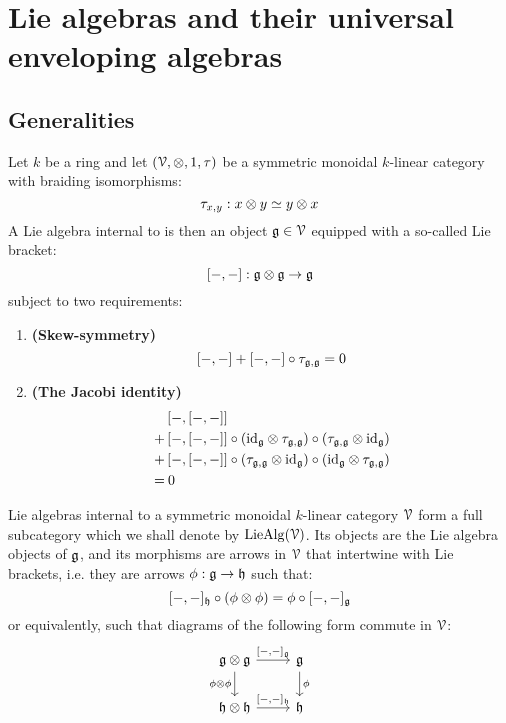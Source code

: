 \section{Lie algebras and their universal enveloping algebras}
    \subsection{Generalities}
        \begin{definition} \label{def: lie_algebras}
            Let $k$ be a ring and let $(\calV, \tensor, 1, \tau)$ be a symmetric monoidal $k$-linear category with braiding isomorphisms:
                $$\tau_{x, y}: x \tensor y \cong y \tensor x$$
            A Lie algebra internal to is then an object $\mathfrak{g} \in \mathcal{V}$ equipped with a so-called Lie bracket:
                $$[-,-]: \g \tensor \g \to \g$$
            subject to two requirements:
                \begin{enumerate}
                    \item \textbf{(Skew-symmetry)}
                        $$[-,-] + [-,-] \circ \tau_{\mathfrak{g}, \mathfrak{g}} = 0$$
                    \item \textbf{(The Jacobi identity)}
                        $$
                            \begin{aligned}
                                & \left[-, [-,-]\right]
                                \\
                                + & \left[-, [-,-]\right] \circ \left(\id_{\g} \tensor \tau_{\g, \g}\right) \circ \left(\tau_{\g, \g} \tensor \id_{\g}\right)
                                \\
                                + & \left[-, [-,-]\right] \circ \left(\tau_{\g, \g} \tensor \id_{\g}\right) \circ \left(\id_{\g} \tensor \tau_{\g, \g}\right)
                                \\
                                = & \: 0
                            \end{aligned}
                        $$
                \end{enumerate}
            Lie algebras internal to a symmetric monoidal $k$-linear category $\mathcal{V}$ form a full subcategory which we shall denote by $\mathrm{Lie}\mathrm{Alg}(\mathcal{V})$. Its objects are the Lie algebra objects of $\mathfrak{g}$, and its morphisms are arrows in $\mathcal{V}$ that intertwine with Lie brackets, i.e. they are arrows $\phi: \mathfrak{g} \to \mathfrak{h}$ such that:
                $$[-,-]_{\h} \circ (\phi \tensor \phi) = \phi \circ [-,-]_{\g}$$
            or equivalently, such that diagrams of the following form commute in $\mathcal{V}$:
                $$
                    \begin{tikzcd}
                    	{\g \tensor \g} & {\g} \\
                    	{\h \tensor \h} & {\h}
                    	\arrow["{\phi}", from=1-2, to=2-2]
                    	\arrow["{\phi \tensor \phi}"', from=1-1, to=2-1]
                    	\arrow["{[-,-]_{\h}}", from=2-1, to=2-2]
                    	\arrow["{[-,-]_{\g}}", from=1-1, to=1-2]
                    \end{tikzcd}
                $$
        \end{definition}
        
